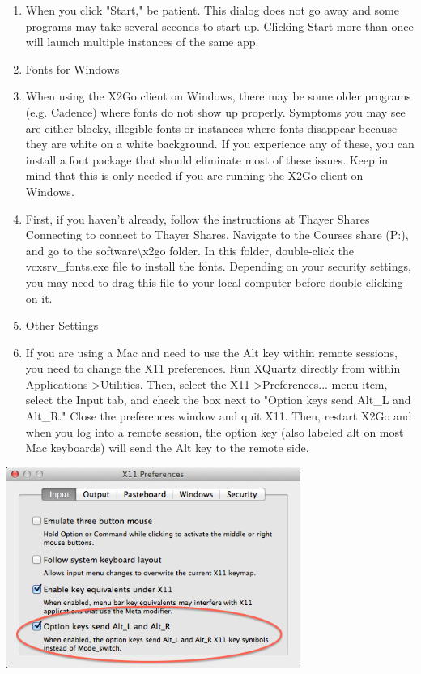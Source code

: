 \documentclass[
]{article}
\begin{document}
\begin{enumerate}
\def\labelenumi{\arabic{enumi}.}
\setcounter{enumi}{18}
\item
  When you click "Start," be patient. This dialog does not go away and
  some programs may take several seconds to start up. Clicking Start
  more than once will launch multiple instances of the same app.
\item
  Fonts for Windows
\item
  When using the X2Go client on Windows, there may be some older
  programs (e.g. Cadence) where fonts do not show up properly. Symptoms
  you may see are either blocky, illegible fonts or instances where
  fonts disappear because they are white on a white background. If you
  experience any of these, you can install a font package that should
  eliminate most of these issues. Keep in mind that this is only needed
  if you are running the X2Go client on Windows.
\item
  First, if you haven't already, follow the instructions at Thayer
  Shares Connecting to connect to Thayer Shares. Navigate to the Courses
  share (P:), and go to the software\textbackslash x2go folder. In this
  folder, double-click the vcxsrv\_fonts.exe file to install the fonts.
  Depending on your security settings, you may need to drag this file to
  your local computer before double-clicking on it.
\item
  Other Settings
\item
  If you are using a Mac and need to use the Alt key within remote
  sessions, you need to change the X11 preferences. Run XQuartz directly
  from within Applications-\textgreater Utilities. Then, select the
  X11-\textgreater Preferences... menu item, select the Input tab, and
  check the box next to "Option keys send Alt\_L and Alt\_R." Close the
  preferences window and quit X11. Then, restart X2Go and when you log
  into a remote session, the option key (also labeled alt on most Mac
  keyboards) will send the Alt key to the remote side.
\end{enumerate}

\includegraphics[width=3.78346in,height=2.57874in]{images/media/image13.png}
\end{document}
